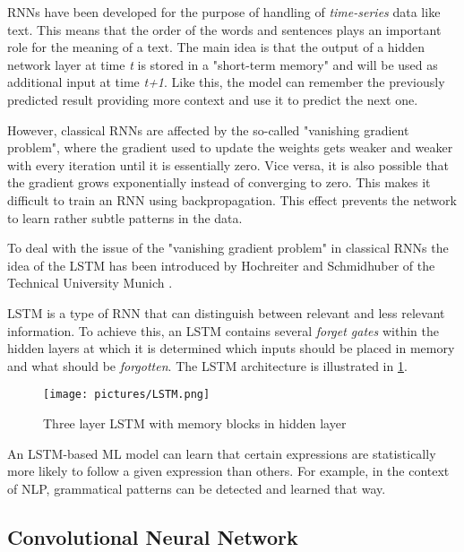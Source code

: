 \acp{RNN} have been developed for the purpose of handling of \textit{time-series} data like text. This means that the order of the words and sentences plays an important role for the meaning of a text. 
The main idea is that the output of a hidden network layer at time \textit{t} is stored in a "short-term memory" and will be used as additional input at time \textit{t+1}. Like this, the model can remember the previously predicted result providing more context and use it to predict the next one. \cite{hochreiter1997long,gers2000learning}

However, classical \acp{RNN} are affected by the so-called "vanishing gradient problem", where the gradient used to update the weights gets weaker and weaker with every iteration until it is essentially zero. Vice versa, it is also possible that the gradient grows exponentially instead of converging to zero. This makes it difficult to train an \ac{RNN} using backpropagation. This effect prevents the network to learn rather subtle patterns in the data. \cite{hochreiter2001gradient}

To deal with the issue of the "vanishing gradient problem" in classical \acp{RNN} the idea of the \ac{LSTM} has been introduced by Hochreiter and Schmidhuber of the Technical University Munich \cite{hochreiter1997long}. 

\ac{LSTM} is a type of \ac{RNN} that can distinguish between relevant and less relevant information. To achieve this, an \ac{LSTM} contains several \textit{forget gates} within the hidden layers at which it is determined which inputs should be placed in memory and what should be \textit{forgotten}. The \ac{LSTM} architecture is illustrated in \cref{pic:LSTM}.

\begin{figure}[ht]
    \centering 
    \texttt{[image: pictures/LSTM.png]}
    \caption{Three layer LSTM with memory blocks in hidden layer \cite{gers2000learning}}
    \label{pic:LSTM}    %
\end{figure}

An LSTM-based ML model can learn that certain expressions are statistically more likely to follow a given expression than others. For example, in the context of \ac{NLP}, grammatical patterns can be detected and learned that way.
\cite{hochreiter1997long,hochreiter2001gradient}

\subsection{Convolutional Neural Network}
